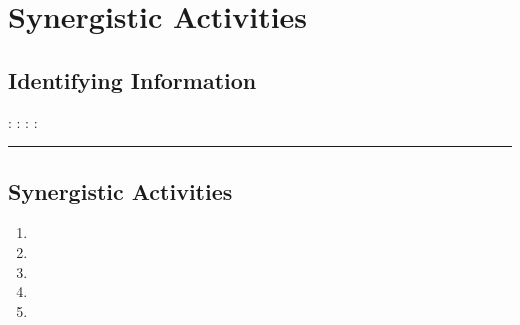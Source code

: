 \documentclass[../preamble.tex]{subfiles}
\begin{document}
\section{Synergistic Activities}



\subsection*{Identifying Information}
: %
:
:
: %
\pn\rule{\textwidth}{0.4pt}
\subsection*{Synergistic Activities}
\begin{enumerate}
    \item 
    \item 
    \item 
    \item 
    \item 
\end{enumerate}
\end{document}
